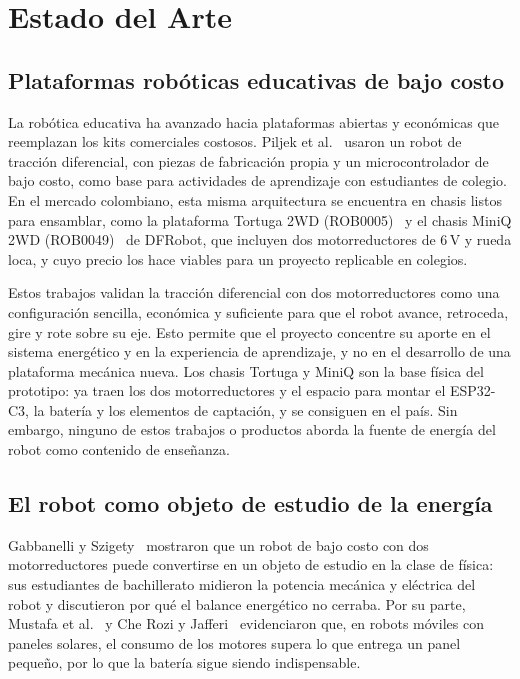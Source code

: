 \documentclass[11pt]{article}
\begin{document}
\newpage
\section{Estado del Arte}
 
\subsection{Plataformas robóticas educativas de bajo costo}
 
La robótica educativa ha avanzado hacia plataformas abiertas y económicas que
reemplazan los kits comerciales costosos. Piljek et al.~\cite{piljek2023mobile} usaron un
robot de tracción diferencial, con piezas de fabricación propia y un microcontrolador de
bajo costo, como base para actividades de aprendizaje con estudiantes de colegio. En el
mercado colombiano, esta misma arquitectura se encuentra en chasis listos para ensamblar,
como la plataforma Tortuga 2WD (ROB0005)~\cite{sigma2026rob0005} y el chasis MiniQ 2WD
(ROB0049)~\cite{sigma2026rob0049} de DFRobot, que incluyen dos motorreductores de 6\,V y
rueda loca, y cuyo precio los hace viables para un proyecto replicable en colegios.
 
Estos trabajos validan la tracción diferencial con dos
motorreductores como una configuración sencilla, económica y suficiente para que el
robot avance, retroceda, gire y rote sobre su eje. Esto permite que el proyecto concentre
su aporte en el sistema energético y en la experiencia de aprendizaje, y no en el
desarrollo de una plataforma mecánica nueva. Los chasis Tortuga y MiniQ son la base
física del prototipo: ya traen los dos motorreductores y el espacio para montar el
ESP32-C3, la batería y los elementos de captación, y se consiguen en el país. Sin
embargo, ninguno de estos trabajos o productos aborda la fuente de energía del robot como
contenido de enseñanza.
 
\subsection{El robot como objeto de estudio de la energía}
 
Gabbanelli y Szigety~\cite{gabbanelli2023robot} mostraron que un robot de bajo costo con
dos motorreductores puede convertirse en un objeto de estudio en la clase de física:
sus estudiantes de bachillerato midieron la potencia mecánica y eléctrica del robot y
discutieron por qué el balance energético no cerraba. Por su parte, Mustafa et
al.~\cite{mustafa2026solar} y Che Rozi y Jafferi~\cite{cherozi2024solar} evidenciaron
que, en robots móviles con paneles solares, el consumo de los motores supera lo que
entrega un panel pequeño, por lo que la batería sigue siendo indispensable.
 
\end{document}
